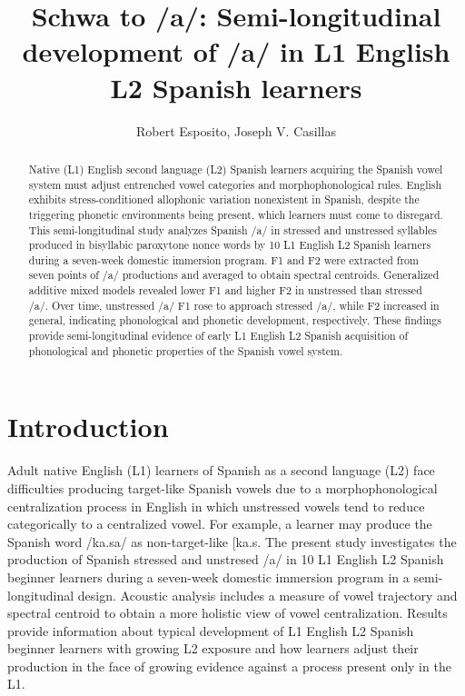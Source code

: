\documentclass[
  a4paper,
  11pt,
  twocolumn]{article}
\author{}
\date{\vspace{-2.5em}}
\begin{document}
\title{Schwa to /\protect\MakeLowercase{a}/: Semi-longitudinal development of /\protect\MakeLowercase{a}/ in L1 English L2 Spanish learners}
\author{Robert Esposito, Joseph V. Casillas}


\maketitle

\begin{abstract}
Native (L1) English second language (L2) Spanish learners acquiring the Spanish vowel system must adjust entrenched vowel categories and morphophonological rules. English exhibits stress-conditioned allophonic variation nonexistent in Spanish, despite the triggering phonetic environments being present, which learners must come to disregard. This semi-longitudinal study analyzes Spanish /a/ in stressed and unstressed syllables produced in bisyllabic paroxytone nonce words by 10 L1 English L2 Spanish learners during a seven-week domestic immersion program. F1 and F2 were extracted from seven points of /a/ productions and averaged to obtain spectral centroids. Generalized additive mixed models revealed lower F1 and higher F2 in unstressed than stressed /a/. Over time, unstressed /a/ F1 rose to approach stressed /a/, while F2 increased in general, indicating phonological and phonetic development, respectively. These findings provide semi-longitudinal evidence of early L1 English L2 Spanish acquisition of phonological and phonetic properties of the Spanish vowel system.
\end{abstract}



\section{Introduction}

Adult native English (L1) learners of Spanish as a second language (L2)
face difficulties producing target-like Spanish vowels due to a
morphophonological centralization process in English in which unstressed
vowels tend to reduce categorically to a centralized vowel. For example,
a learner may produce the Spanish word /ka.sa/ as
non-target-like {[}ka.s\textipa{@}{]}. The present study
investigates the production of Spanish stressed and unstresed /a/ in 10
L1 English L2 Spanish beginner learners during a seven-week domestic
immersion program in a semi-longitudinal design. Acoustic analysis
includes a measure of vowel trajectory and spectral centroid to obtain a
more holistic view of vowel centralization. Results provide information
about typical development of L1 English L2 Spanish beginner learners
with growing L2 exposure and how learners adjust their production in the
face of growing evidence against a process present only in the L1.
\end{document}
